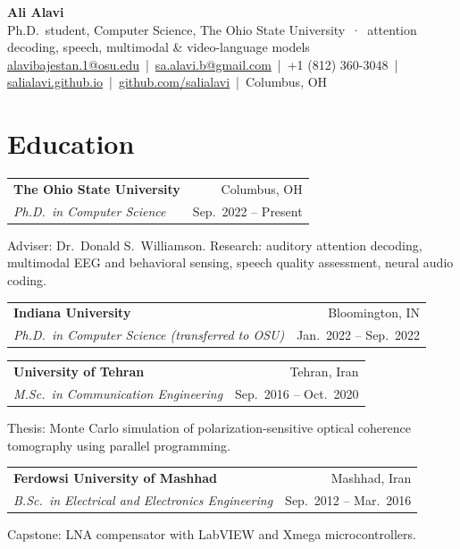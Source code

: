\documentclass[10pt,letterpaper]{article}
\makeatletter
\newcommand{\entry}[4]{%
  \begin{tabularx}{\linewidth}{@{}X r@{}}
    \textbf{#1} & {\color{muted}#2} \\
    \textit{#3} & {\color{muted}\small #4}
  \end{tabularx}\par\vspace{1pt}}
\makeatother
\begin{document}
\begin{center}
  {\sffamily\bfseries\fontsize{24}{26}\selectfont Ali Alavi}\\[3pt]
  {\color{muted}\small Ph.D.\ student, Computer Science, The Ohio State University
   \,·\, attention decoding, speech, multimodal \& video-language models}\\[3pt]
  \small
  \href{mailto:alavibajestan.1@osu.edu}{alavibajestan.1@osu.edu} \,|\,
  \href{mailto:sa.alavi.b@gmail.com}{sa.alavi.b@gmail.com} \,|\,
  +1 (812) 360-3048 \,|\,
  \href{https://salialavi.github.io}{\color{accent}salialavi.github.io} \,|\,
  \href{https://github.com/salialavi}{github.com/salialavi} \,|\,
  Columbus, OH
\end{center}
\vspace{-8pt}

\section{Education}
\entry{The Ohio State University}{Columbus, OH}{Ph.D.\ in Computer Science}{Sep.\ 2022 -- Present}
{\small Adviser: Dr.\ Donald S.\ Williamson. Research: auditory attention decoding, multimodal EEG and behavioral
sensing, speech quality assessment, neural audio coding.}\par\vspace{3pt}
\entry{Indiana University}{Bloomington, IN}{Ph.D.\ in Computer Science (transferred to OSU)}{Jan.\ 2022 -- Sep.\ 2022}
\vspace{1pt}
\entry{University of Tehran}{Tehran, Iran}{M.Sc.\ in Communication Engineering}{Sep.\ 2016 -- Oct.\ 2020}
{\small Thesis: Monte Carlo simulation of polarization-sensitive optical coherence tomography using parallel programming.}\par\vspace{3pt}
\entry{Ferdowsi University of Mashhad}{Mashhad, Iran}{B.Sc.\ in Electrical and Electronics Engineering}{Sep.\ 2012 -- Mar.\ 2016}
{\small Capstone: LNA compensator with LabVIEW and Xmega microcontrollers.}

\end{document}
